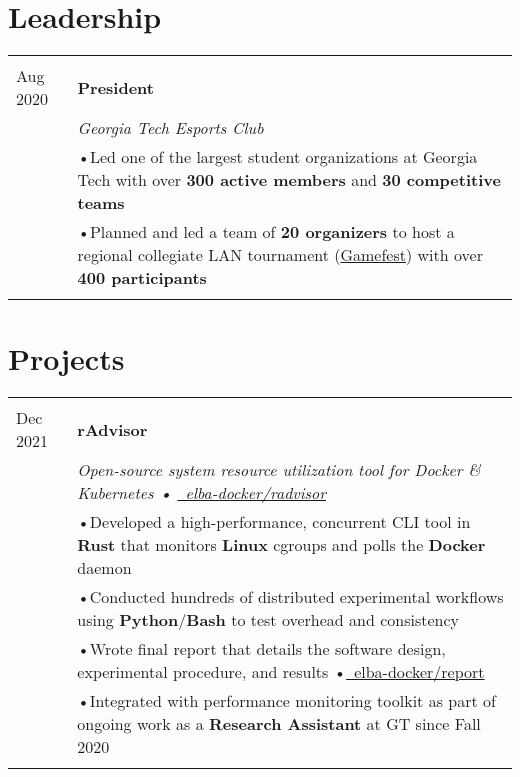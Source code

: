 \documentclass[a4paper,11pt]{article}
\newenvironment{rsection}[1]
  {
    \section{#1}
    \begin{tabular}{>{\raggedleft\arraybackslash}p{\lcolwidth}|p{\rcolwidth}}
   } {
    \\\multicolumn{2}{c}{} \\[-10pt]
    \end{tabular}
  }
\newcommand{\rheader}[2]{
    \multirow[t]{2}{*}{
        \begin{minipage}[t]{\dimexpr \lcolwidth - 0.1cm}
            \begin{flushright}
                \textsc{#1}
            \end{flushright}
        \end{minipage}
    } & \textbf{#2}
}
\newcommand{\rdesc}[1]{
  \\[-2pt]&\small{\emph{#1}\vspace{1pt} }
}
\newcommand{\ritem}[2][ •\hspace{3pt}]{\\[-2pt]& \footnotesize{#1#2}}
\newcommand{\rdot}{\xspace\hspace{0pt}•\hspace{3pt}\xspace}
\begin{document}
\begin{rsection}{Leadership}
  \rheader{July 2019 -\\[-1pt] Aug 2020}{President}
  \rdesc{Georgia Tech Esports Club}
  \ritem{Led one of the largest student organizations at Georgia Tech
    with over \textbf{300 active members} and \textbf{30 competitive teams}}
  \ritem{Planned and led a team of \textbf{20 organizers} to host a regional
    collegiate LAN tournament
    (\href{https://web.archive.org/web/20201111230854/https://gamefest.gg/}{Gamefest})
    with over \textbf{400 participants}}
\end{rsection}
\vspace{\sectionvspace}


\begin{rsection}{Projects}
  \rheader{Feb 2020 -\\[-1pt] Dec 2021}{rAdvisor}
  \rdesc{Open-source system resource utilization tool for Docker \& Kubernetes
    {\normalfont \rdot
    \href{https://github.com/elba-docker/radvisor}{\faGithub\ elba-docker/radvisor}}}
  \ritem{Developed a high-performance, concurrent CLI tool in \textbf{Rust}
    that monitors \textbf{Linux} cgroups and polls the \textbf{Docker} daemon}
  \ritem{Conducted hundreds of distributed experimental workflows
    using \textbf{Python}/\textbf{Bash} to test overhead and consistency}
  \ritem{Wrote final report that details the software design, experimental procedure, and results
    \rdot \href{https://github.com/elba-docker/report}{\faGithub\ elba-docker/report}}
  \ritem{Integrated with performance monitoring toolkit as part of ongoing work
    as a \textbf{Research Assistant} at GT since Fall 2020}
\end{rsection}
\end{document}
